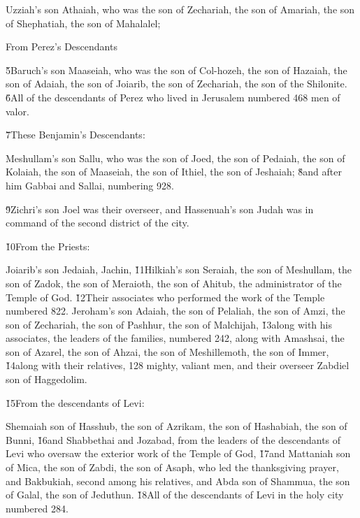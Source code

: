 Uzziah's son Athaiah, who was the son of Zechariah, the son of Amariah, the son of Shephatiah, the son of Mahalalel;

From Perez's Descendants

\v{5}Baruch's son Maaseiah, who was the son of Col-hozeh, the son of Hazaiah, the son of Adaiah, the son of Joiarib, the son of Zechariah, the son of the Shilonite. \v{6}All of the descendants of Perez who lived in Jerusalem numbered 468 men of valor.

\v{7}These Benjamin's Descendants:

Meshullam's son Sallu, who was the son of Joed, the son of Pedaiah, the son of Kolaiah, the son of Maaseiah, the son of Ithiel, the son of Jeshaiah; \v{8}and after him Gabbai and Sallai, numbering 928.

\v{9}Zichri's son Joel was their overseer, and Hassenuah's son Judah was in command of the second district of the city.

\v{10}From the Priests:

Joiarib's son Jedaiah, Jachin, \v{11}Hilkiah's son Seraiah, the son of Meshullam, the son of Zadok, the son of Meraioth, the son of Ahitub, the administrator of the Temple of God. \v{12}Their associates who performed the work of the Temple numbered 822. Jeroham's son Adaiah, the son of Pelaliah, the son of Amzi, the son of Zechariah, the son of Pashhur, the son of Malchijah, \v{13}along with his associates, the leaders of the families, numbered 242, along with Amashsai, the son of Azarel, the son of Ahzai, the son of Meshillemoth, the son of Immer, \v{14}along with their relatives, 128 mighty, valiant men, and their overseer Zabdiel son of Haggedolim.

\v{15}From the descendants of Levi:

Shemaiah son of Hasshub, the son of Azrikam, the son of Hashabiah, the son of Bunni, \v{16}and Shabbethai and Jozabad, from the leaders of the descendants of Levi who oversaw the exterior work of the Temple of God, \v{17}and Mattaniah son of Mica, the son of Zabdi, the son of Asaph, who led the thanksgiving prayer, and Bakbukiah, second among his relatives, and Abda son of Shammua, the son of Galal, the son of Jeduthun. \v{18}All of the descendants of Levi in the holy city numbered 284.

